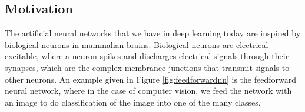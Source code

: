 

\subsection*{Motivation}


The artificial neural networks that we have in deep learning today are inspired by biological neurons in mammalian brains. Biological neurons are electrical excitable, where a neuron spikes and discharges electrical signals through their synapses, which are the complex membrance junctions that transmit signals to other neurons. An example given in Figure \ref{fig:feedforwardnn} is the feedforward neural network, where in the case of computer vision, we feed the network with an image to do classification of the image into one of the many classes.


